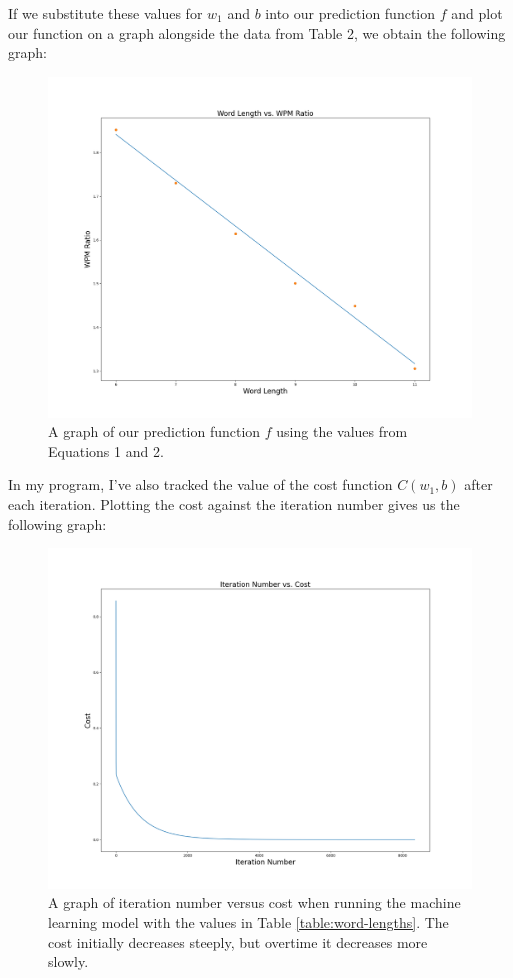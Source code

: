 \documentclass[12pt]{article}
\begin{document}
If we substitute these values for $w_1$ and $b$ into our prediction function $f$ and plot our function on a graph alongside the data from Table 2, we obtain the following graph:
\begin{figure}[H]
	\centering
	\caption{A graph of our prediction function $f$ using the values from Equations 1 and 2.}
	\includegraphics[width=\textwidth]{word-length-vs-wpm-ratio.png}
\end{figure}

In my program, I've also tracked the value of the cost function $C(w_1, b)$ after each iteration. Plotting the cost against the iteration number gives us the following graph:
\begin{figure}[H]
	\centering
	\caption{A graph of iteration number versus cost when running the machine learning model with the values in Table \ref{table:word-lengths}. The cost initially decreases steeply, but overtime it decreases more slowly.}
	\includegraphics[width=\textwidth]{iteration-no-vs-cost.png}
\end{figure}
\end{document}
